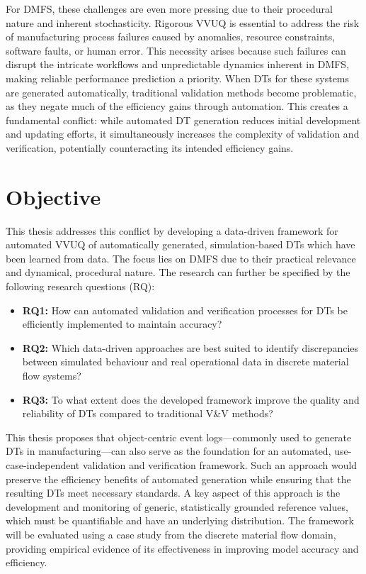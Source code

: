 For DMFS, these challenges are even more pressing due to their procedural nature and inherent stochasticity. Rigorous VVUQ is essential to address the risk of manufacturing process failures caused by anomalies, resource constraints, software faults, or human error. This necessity arises because such failures can disrupt the intricate workflows and unpredictable dynamics inherent in DMFS, making reliable performance prediction a priority. When DTs for these systems are generated automatically, traditional validation methods become problematic, as they negate much of the efficiency gains through automation. This creates a fundamental conflict: while automated DT generation reduces initial development and updating efforts, it simultaneously increases the complexity of validation and verification, potentially counteracting its intended efficiency gains.

\section{Objective}

This thesis addresses this conflict by developing a data-driven framework for automated VVUQ of automatically generated, simulation-based DTs which have been learned from data. The focus lies on DMFS due to their practical relevance and dynamical, procedural nature. The research can further be specified by the following research questions (RQ):

\begin{itemize}
  \label{par:rq1}
  \item \textbf{RQ1:} How can automated validation and verification processes for DTs be efficiently implemented to maintain accuracy?
        \label{par:rq2}
  \item \textbf{RQ2:} Which data-driven approaches are best suited to identify discrepancies between simulated behaviour and real operational data in discrete material flow systems?
        \label{par:rq3}
  \item \textbf{RQ3:} To what extent does the developed framework improve the quality and reliability of DTs compared to traditional V\&V methods?
\end{itemize}

This thesis proposes that object-centric event logs—commonly used to generate DTs in manufacturing—can also serve as the foundation for an automated, use-case-independent validation and verification framework. Such an approach would preserve the efficiency benefits of automated generation while ensuring that the resulting DTs meet necessary standards. A key aspect of this approach is the development and monitoring of generic, statistically grounded reference values, which must be quantifiable and have an underlying distribution. The framework will be evaluated using a case study from the discrete material flow domain, providing empirical evidence of its effectiveness in improving model accuracy and efficiency.

